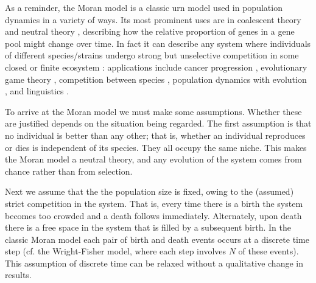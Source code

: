 As a reminder, the Moran model \cite{Moran1962} is a classic urn model used in population dynamics in a variety of ways.
Its most prominent uses are in coalescent theory \cite{Blythe2007,Etheridge2010} and neutral theory \cite{Kimura1956,Bell2000,Hubbell2001}, describing how the relative proportion of genes in a gene pool might change over time. 
In fact it can describe any system where individuals of different species/strains undergo strong but unselective competition in some closed or finite ecosystem \cite{Claussen2005}: applications include cancer progression \cite{Ashcroft2015}, evolutionary game theory \cite{Tayloer2004,Antal2006,Hilbe2011}, competition between species \cite{Houchmandzadeh2010,Blythe2011,Constable2015}, population dynamics with evolution \cite{Traulsen2006}, and linguistics \cite{Blythe2007}. 

\iffalse
To arrive at the Moran model we must make some assumptions.
Whether these are justified depends on the situation being regarded.
The first assumption is that no individual is better than any other; that is, whether an individual reproduces or dies is independent of its species. %
They all occupy the same niche. 
This makes the Moran model a neutral theory, and any evolution of the system comes from chance rather than from selection. 

Next we assume that the the population size is fixed, owing to the (assumed) strict competition in the system.
That is, every time there is a birth the system becomes too crowded and a death follows immediately. Alternately, upon death there is a free space in the system that is filled by a subsequent birth.
In the classic Moran model each pair of birth and death events occurs at a discrete time step (cf. the Wright-Fisher model, where each step involves $N$ of these events). %
This assumption of discrete time can be relaxed without a qualitative change in results. 


